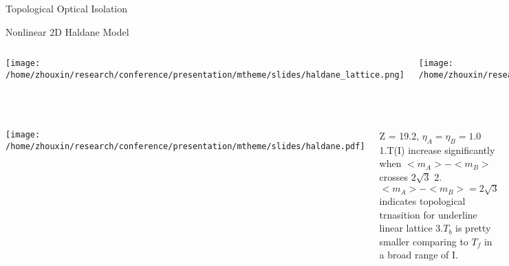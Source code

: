 \documentclass{beamer}
\begin{document}
\begin{frame}{Topological Optical Isolation}
         \begin{block}{Nonlinear 2D Haldane Model}       
       \begin{columns}
             \hspace*{-2em}
             \texttt{[image: /home/zhouxin/research/conference/presentation/mtheme/slides/haldane\_lattice.png]}
             
             \hspace*{-5em}
             \texttt{[image: /home/zhouxin/research/conference/presentation/mtheme/slides/pd.png]}\hspace*{-10.5em}             
             
             
                    \vskip -0.5cm 
\hspace*{-4.5em}
\mbox{Nonlinear on-site potential}

\hspace*{-6.5em}
$m_A^{\mu} = \frac{m_0}{1+|a_{\mu}|^2}, m_B^{\mu} = \frac{-m_0}{1+|b_{\mu}|^2}$
\hspace*{-6.5em}
\mbox{$t_1=1, t_2=\frac{1}{3}, \phi=\frac{\pi}{2}, m_0=2$}

\vskip 0.2cm
\hspace*{-6.5em}
\mbox{For fixed $t_1, t_2, \phi$, topological phase} 
\hspace*{-6.5em}
\mbox{ transition happens at} 
\hspace*{-4.5em}
\mbox{$m_A-m_B=|6\sqrt{3}t_2\sin{\phi}|$}
         \end{columns} 
         \end{block}

 \vskip -0.6cm
         \begin{block}{}
         
       \begin{columns}
             \hspace*{0.5em}
             \texttt{[image: /home/zhouxin/research/conference/presentation/mtheme/slides/haldane.pdf]}\hspace*{-10.5em}

Z = 19.2, $\eta_A=\eta_B=1.0$
 \vskip -0.1cm
 \hspace*{-2em}
{\small 1.T(I) increase significantly when $<m_A>-<m_B>$ crosses $2\sqrt{3}$}
 \vskip 0.1cm
 \hspace*{-2em}
{\small 2.$<m_A>-<m_B> = 2\sqrt{3}$ indicates topological trnasition for underline linear lattice}
 \vskip 0.1cm
 \hspace*{-2em}
{\small 3.$T_b$ is pretty smaller comparing to $T_f$ in a broad range of I.}






\end{columns}
\end{block}
\end{frame}
\end{document}

